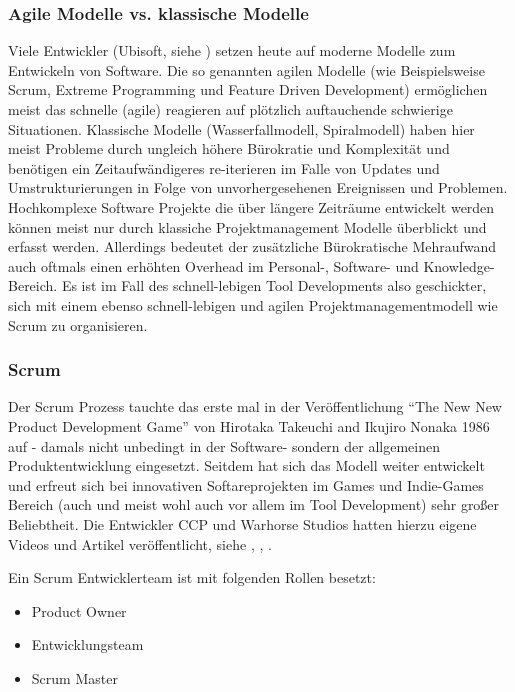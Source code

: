 \documentclass[pagesize, paper=a4, fontsize=12pt,titlepage=true, headings=small, headnosepline, abstractoff, liststotoc, nochapterprefix, plainheadsepline, twoside]{scrreprt}
\begin{document}
\subsubsection{Agile Modelle vs. klassische Modelle}
Viele Entwickler (Ubisoft, siehe \cite{MKG:Schmitz2014}) setzen heute auf moderne Modelle zum Entwickeln von Software. Die so genannten agilen Modelle (wie Beispielsweise Scrum,  Extreme Programming und Feature Driven Development) ermöglichen meist das schnelle (agile) reagieren auf plötzlich auftauchende schwierige Situationen. Klassische Modelle (Wasserfallmodell, Spiralmodell) haben hier meist Probleme durch ungleich höhere Bürokratie und Komplexität und benötigen ein Zeitaufwändigeres re-iterieren im Falle von Updates und Umstrukturierungen in Folge von unvorhergesehenen Ereignissen und Problemen. Hochkomplexe Software Projekte die über längere Zeiträume entwickelt werden können meist nur durch klassiche Projektmanagement Modelle überblickt und erfasst werden. Allerdings bedeutet der zusätzliche Bürokratische Mehraufwand auch oftmals einen erhöhten Overhead im Personal-, Software- und Knowledge-Bereich. Es ist im Fall des schnell-lebigen Tool Developments also geschickter, sich mit einem ebenso schnell-lebigen und agilen Projektmanagementmodell wie Scrum zu organisieren.
\subsubsection{Scrum}
Der Scrum Prozess tauchte das erste mal in der Veröffentlichung “The New New Product Development Game” von Hirotaka Takeuchi and Ikujiro Nonaka 1986 auf - damals nicht unbedingt in der Software- sondern der allgemeinen Produktentwicklung eingesetzt. Seitdem hat sich das Modell weiter entwickelt und erfreut sich bei innovativen Softareprojekten im Games und Indie-Games Bereich (auch und meist wohl auch vor allem im Tool Development) sehr großer Beliebtheit. Die Entwickler CCP und Warhorse Studios hatten hierzu eigene Videos und Artikel veröffentlicht, siehe \cite{CCP:ScrumAndAgile2009}, \cite{WH:Scrum2013}, \cite{WH:ScrumVideo2013}.

Ein Scrum Entwicklerteam ist mit folgenden Rollen besetzt:
\begin{itemize}
\item Product Owner
\item Entwicklungsteam
\item Scrum Master
\end{itemize}
\end{document}
